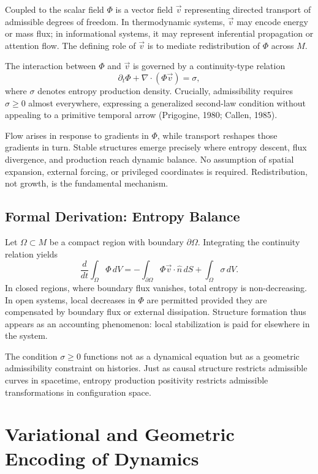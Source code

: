 \documentclass[11pt]{article}
\begin{document}
Coupled to the scalar field $\Phi$ is a vector field $\vec{v}$ representing directed transport of admissible degrees of freedom. In thermodynamic systems, $\vec{v}$ may encode energy or mass flux; in informational systems, it may represent inferential propagation or attention flow. The defining role of $\vec{v}$ is to mediate redistribution of $\Phi$ across $M$.

The interaction between $\Phi$ and $\vec{v}$ is governed by a continuity-type relation
\[
\partial_t \Phi + \nabla \cdot (\Phi \vec{v}) = \sigma,
\]
where $\sigma$ denotes entropy production density. Crucially, admissibility requires $\sigma \ge 0$ almost everywhere, expressing a generalized second-law condition without appealing to a primitive temporal arrow (Prigogine, 1980; Callen, 1985).

Flow arises in response to gradients in $\Phi$, while transport reshapes those gradients in turn. Stable structures emerge precisely where entropy descent, flux divergence, and production reach dynamic balance. No assumption of spatial expansion, external forcing, or privileged coordinates is required. Redistribution, not growth, is the fundamental mechanism.

\subsection*{Formal Derivation: Entropy Balance}

Let $\Omega \subset M$ be a compact region with boundary $\partial \Omega$. Integrating the continuity relation yields
\[
\frac{d}{dt} \int_\Omega \Phi \, dV
=
- \int_{\partial \Omega} \Phi \vec{v} \cdot \hat{n} \, dS
+ \int_\Omega \sigma \, dV.
\]
In closed regions, where boundary flux vanishes, total entropy is non-decreasing. In open systems, local decreases in $\Phi$ are permitted provided they are compensated by boundary flux or external dissipation. Structure formation thus appears as an accounting phenomenon: local stabilization is paid for elsewhere in the system.

The condition $\sigma \ge 0$ functions not as a dynamical equation but as a geometric admissibility constraint on histories. Just as causal structure restricts admissible curves in spacetime, entropy production positivity restricts admissible transformations in configuration space.

\bigskip

\section{Variational and Geometric Encoding of Dynamics}
\end{document}
